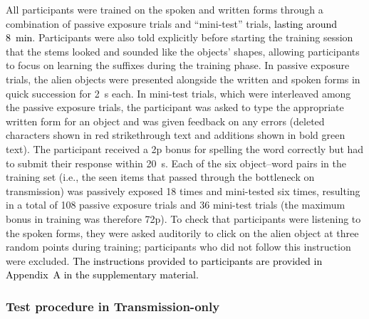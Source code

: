 \documentclass[doc,biblatex]{apa7}
\newcommand\firstrevision[1]{\textcolor{black}{#1}}
\begin{document}
All participants were trained on the spoken and written forms through a combination of passive exposure trials and ``mini-test'' trials\firstrevision{, lasting around 8~min}. Participants were also told explicitly before starting the training session that the stems looked and sounded like the objects' shapes, allowing participants to focus on learning the suffixes during the training phase. In passive exposure trials, the alien objects were presented alongside the written and spoken forms in quick succession for 2~s each. In mini-test trials, which were interleaved among the passive exposure trials, the participant was asked to type the appropriate written form for an object and was given feedback on any errors (deleted characters shown in red strikethrough text and additions shown in bold green text). The participant received a 2p bonus for spelling the word correctly but had to submit their response within 20~s. Each of the six object--word pairs in the training set (i.e., the seen items that passed through the bottleneck on transmission) was passively exposed 18 times and mini-tested six times, resulting in a total of 108 passive exposure trials and 36 mini-test trials (the maximum bonus in training was therefore 72p). To check that participants were listening to the spoken forms, they were asked auditorily to click on the alien object at three random points during training; participants who did not follow this instruction were excluded. \firstrevision{The instructions provided to participants are provided in Appendix~A in the supplementary material.}

\subsubsection{Test procedure in Transmission-only}
\end{document}
